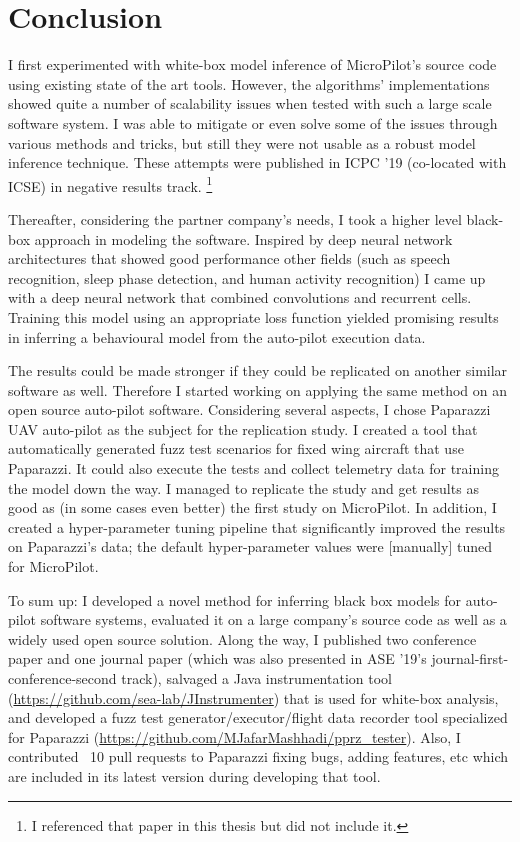 \chapter{Conclusion} \label{sec:summary} %
I first experimented with white-box model inference of MicroPilot's source code using existing state of the art tools. 
However, the algorithms' implementations showed quite a number of scalability issues when tested with such a large scale software system. I was able to mitigate or even solve some of the issues through various methods and tricks, but still they were not usable as a robust model inference technique. These attempts were published in ICPC '19 (co-located with ICSE) in negative results track. \footnote{I referenced that paper \cite{mashhadi2019empirical} in this thesis but did not include it.}

Thereafter, considering the partner company's needs, I took a higher level black-box approach in modeling the software. Inspired by deep neural network architectures that showed good performance other fields (such as speech recognition, sleep phase detection, and human activity recognition) I came up with a deep neural network that combined convolutions and recurrent cells. Training this model using an appropriate loss function yielded promising results in inferring a behavioural model from the auto-pilot execution data.

The results could be made stronger if they could be replicated on another similar software as well. Therefore I started working on applying the same method on an open source auto-pilot software. Considering several aspects, I chose Paparazzi UAV auto-pilot as the subject for the replication study. I created a tool that automatically generated fuzz test scenarios for fixed wing aircraft that use Paparazzi. It could also execute the tests and collect telemetry data for training the model down the way. 
I managed to replicate the study and get results as good as (in some cases even better) the first study on MicroPilot. In addition, I created a hyper-parameter tuning pipeline that significantly improved the results on Paparazzi's data; the default hyper-parameter values were [manually] tuned for MicroPilot.

To sum up: I developed a novel method for inferring black box models for auto-pilot software systems, evaluated it on a large company's source code as well as a widely used open source solution. Along the way, I published two conference paper and one journal paper (which was also presented in ASE '19's journal-first-conference-second track), salvaged a Java instrumentation tool (\url{https://github.com/sea-lab/JInstrumenter}) that is used for white-box analysis, and developed a fuzz test generator/executor/flight data recorder tool specialized for Paparazzi (\url{https://github.com/MJafarMashhadi/pprz_tester}). Also, I contributed ~10 pull requests to Paparazzi fixing bugs, adding features, etc which are included in its latest version during developing that tool.



